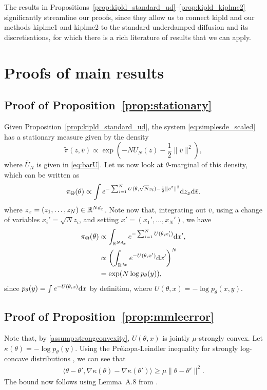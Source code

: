 \begin{remark} The results in Propositions~\ref{prop:kipld_standard_ud}--\ref{prop:kipld_kiplmc2} significantly streamline our proofs, since they allow us to connect \gls*{kipld} and our methods \gls*{kiplmc1} and \gls*{kiplmc2} to the standard underdamped diffusion and its discretisations, for which there is a rich literature of results that we can apply.
\end{remark}
\section{Proofs of main results}\label{app:proofs}

\subsection{Proof of Proposition~\ref{prop:stationary}}\label{app:proofstationary}
Given Proposition~\ref{prop:kipld_standard_ud}, the system \eqref{eq:simplesde_scaled} has a stationary measure given by the density
\begin{equation*}
\tilde{\pi}(z, \bar{v}) \propto \exp \left(-N\bar{U}_N(z) - \frac{1}{2}\|\bar{v}\|^2 \right),
\end{equation*}
where $\bar{U}_N$ is given in \eqref{eq:barU}. Let us now look at $\theta$-marginal of this density, which can be written as
\begin{equation*}
\pi_\Theta (\theta) \propto \int
e^{-\sum_{i=1}^N U(\theta, \sqrt{N} z_i) - \frac{1}{2} \|\bar{v}^z\|^2}  {\mathrm d} z_x {\mathrm d} \bar{v}.
\end{equation*}
where $z_x = (z_1, \ldots, z_N) \in {\mathbb R}^{N d_x}$. Note now that, integrating out $\bar{v}$, using a change of variables $x_i' = \sqrt{N} z_i$, and setting $x' = (x_1', \ldots, x_N')$, we have
\begin{align*}
\pi_\Theta (\theta) &\propto\int_{\mathbb{R}^{Nd_x}} 
e^{-\sum_{i=1}^N U(\theta, x'_i)} {\mathrm d} x', \\
&\propto \left(\int_{{\mathbb R}^{d_x}} e^{-U(\theta, x') } {\mathrm d} x'\right)^N\\
&= \exp(N \log p_\theta(y)),
\end{align*}
since $p_\theta(y) = \int e^{-U(\theta, x)} {\mathrm d} x$ by definition, where $U(\theta, x) = -\log p_\theta(x, y)$.

\subsection{Proof of Proposition~\ref{prop:mmleerror}}\label{app:proofmmleerror}
Note that, by \ref{assump:strongconvexity}, $U(\theta, x)$ is jointly $\mu$-strongly convex. Let $\kappa(\theta) = - \log p_\theta(y)$. Using the Pr\'{e}kopa-Leindler inequality for strongly log-concave distributions \citep[Theorem~3.8]{saumard2014log}, we can see that
\begin{align*}
\langle \theta - \theta', \nabla \kappa(\theta) - \nabla \kappa(\theta') \rangle \geq \mu \|\theta - \theta'\|^2.
\end{align*}
The bound now follows using Lemma~A.8 from \citep{altschuler2023fasterhighaccuracylogconcavesampling}.

